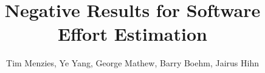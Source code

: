 \documentclass[smallcondesed]{svjour3}
\begin{document}
  

\date{}
%


\title{Negative Results for Software Effort Estimation}


%
%
%
%
%

\author{Tim Menzies, Ye Yang, George Mathew,  Barry Boehm, Jairus Hihn
}
\end{document}
